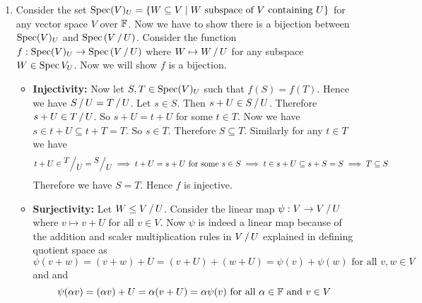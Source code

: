 \documentclass[a4paper, 11pt]{article}
\begin{document}
{\begin{enumerate}[label=(\alph*)]
\begin{itemize}
	\item \textbf{Linear Map:} Let $v+T,w+T\in\quotient{V}{T}$ for some $v,w\in V$. Now $$\vph((v+w)+T)=(v+w)+U=(v+U)+(w+U)=\vph(v+T)+\vph(w+T)$$Let $\alpha\in\bbF$. Then we have $$\vph((\alpha v)+T)=(\alpha v)+U=\alpha(v+U)=\alpha \vph(v)$$Therefore $\vph$ is a well defined linear map.
	\item \textbf{Surjectivity:} Let $v+U\in \quotient{V}{U}$ for some $v\in V$. Since $T\leq U$, $v+T$ is  a vector of $\quotient{V}{T}$. Then $\vph(v+T)=v+U$. Therefore $\vph$ is surjective.
	\item $\boldsymbol{\ker\vph=\quotient{U}{T}}$\textbf{:} Let $v+T\in \ker\vph$ for some $v\in V$. Now $\vph(v+T)=0$. Hence $v+U=0+U\implies v\in U$. Therefore $v+T\in \quotient{U}{T}$ as $\quotient{U}T\leq \quotient{V}{T}$. Hence $\ker\vph\subseteq \quotient{U}{T}$. Now let $u+T\in\quotient{U}{T}$ for some $u\in U$. Since $\quotient{U}T\leq \quotient{V}{T}$, $u+T\in\quotient{V}{T}$. Now $\vph(u+T)=u+U=o+U$. Therefore $u+T\in\ker\vph$. Therefore we have $\ker\vph\supseteq \quotient{U}{T}$. Hence we have $$\ker{\vph}=\quotient{U}{T}$$
\end{itemize}
Therefore using first isomorphism theorem we have $$\quotient{\lt(\quotient{V}{T}\rt)}{\ker\vph}\cong\Im \vph\iff\quotient{\lt(\quotient{V}{T}\rt)}{\lt(\quotient{U}T\rt)}\cong \quotient{V}{U}$$
\item Consider the set $\operatorname{Spec}(V)_U=\{W\subseteq V\mid \text{$W$ subspace of $V$ containing $U$}\}$ for any vector space $V$ over $\mathbb{F}$. Now we have to show there is a bijection between $\operatorname{Spec}(V)_U$ and $\spec\lt(\quotient{V}{U}\rt)$. Consider the function $f:\spec(V)_U\to \spec\lt(\quotient{V}U\rt)$ where $W\mapsto \quotient{W}{U}$ for any subspace $W\in \operatorname{Spec}{V}_U$. Now we will show $f$ is a bijection. \begin{itemize}
	\item \textbf{Injectivity:} Now let $S,T\in \operatorname{Spec}(V)_U$ such that $f(S)=f(T)$. Hence we have $\quotient{S}{U}=\quotient{T}{U}$. Let $s\in S$. Then $s+U\in \quotient{S}{U}$. Therefore $s+U\in \quotient{T}{U}$. So $s+U=t+U$ for some $t\in T$. Now we have $s\in t+U\subseteq t+T=T$. So $s\in T$. Therefore $S\subseteq T$. Similarly for any $t\in T$ we have $$t+U\in \quotient{T}{U}=\quotient{S}{U}\implies t+U=s+U\text{ for some $s\in S$}\implies t\in s+U\subseteq s+S=S\implies T\subseteq S$$Therefore we have $S=T$. Hence $f$ is injective.
	\item \textbf{Surjectivity:} Let $W\leq \quotient{V}{U}$. Consider the linear map $\psi: V\to \quotient{V}{U}$ where $v\mapsto v+U$ for all $v\in V$. Now $\psi $ is  indeed a linear map because of the addition and scaler multiplication rules in $\quotient{V}{U}$ explained in defining quotient space as $$\psi(v+w)=(v+w)+U=(v+U)+(w+U)=\psi(v)+\psi(w) \text{ for all $v,w\in V$} $$ and  and $$\psi(\alpha v)=(\alpha v)+U=\alpha(v+U)=\alpha\psi(v)\text{ for all $\alpha\in\mathbb{F}$ and $v\in V$}$$
	

\end{itemize}
\end{enumerate}}
\end{document}
